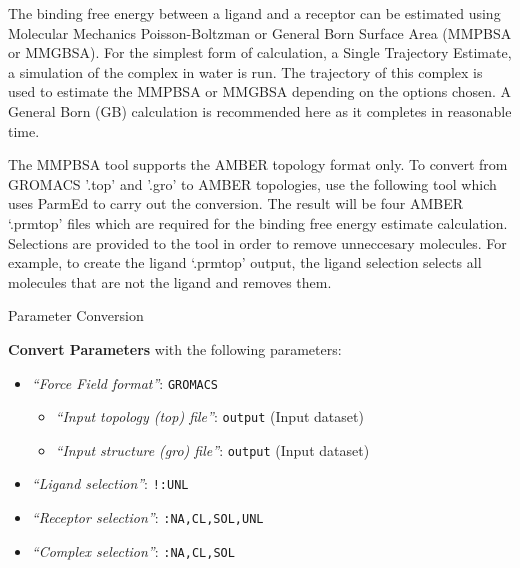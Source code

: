 \documentclass[twocolumn]{bmcart}%
\providecommand{\tightlist}{%
  \setlength{\itemsep}{0pt}\setlength{\parskip}{0pt}}
\begin{document}
The binding free energy between a ligand and a receptor can be estimated using Molecular Mechanics Poisson-Boltzman or General Born Surface Area (MMPBSA or MMGBSA). For
the simplest form of calculation, a Single Trajectory Estimate, a
simulation of the complex in water is run. The trajectory of this complex is used to estimate the
MMPBSA or MMGBSA depending on the options chosen. A General Born (GB)
calculation is recommended here as it completes in reasonable time.


The MMPBSA tool supports the AMBER topology format only. To convert from GROMACS
'.top' and '.gro' to AMBER topologies, use the following tool which uses
ParmEd\cite{Swails2016} to carry out the conversion. The result will be four AMBER `.prmtop'
files which are required for the binding free energy estimate
calculation. Selections are provided to the tool in order to remove unneccesary molecules. For example, to create the ligand `.prmtop' output, the ligand selection selects all molecules that are not the ligand and removes them.

\begin{handson_box_colour}{Parameter Conversion}


  \textbf{Convert Parameters} with the following parameters:

  \begin{itemize}
  \tightlist
  \item
    \emph{``Force Field format''}: \texttt{GROMACS}

    \begin{itemize}
    \tightlist
    \item
      \emph{``Input topology (top) file''}: \texttt{output} (Input
      dataset)
    \item
      \emph{``Input structure (gro) file''}: \texttt{output} (Input
      dataset)
    \end{itemize}
  \item
    \emph{``Ligand selection''}: \texttt{!:UNL}
  \item
    \emph{``Receptor selection''}: \texttt{:NA,CL,SOL,UNL}
  \item
    \emph{``Complex selection''}: \texttt{:NA,CL,SOL}
  \end{itemize}

\end{handson_box_colour}
\end{document}
